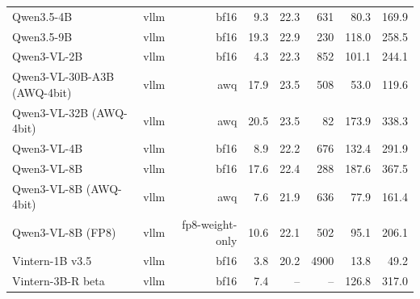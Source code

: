 \begin{table}[t]
\begin{tabular}{lrrrrrrr}
Qwen3.5-4B & vllm & bf16 & 9.3 & 22.3 & 631 & 80.3 & 169.9 \\
Qwen3.5-9B & vllm & bf16 & 19.3 & 22.9 & 230 & 118.0 & 258.5 \\
Qwen3-VL-2B & vllm & bf16 & 4.3 & 22.3 & 852 & 101.1 & 244.1 \\
Qwen3-VL-30B-A3B (AWQ-4bit) & vllm & awq & 17.9 & 23.5 & 508 & 53.0 & 119.6 \\
Qwen3-VL-32B (AWQ-4bit) & vllm & awq & 20.5 & 23.5 & 82 & 173.9 & 338.3 \\
Qwen3-VL-4B & vllm & bf16 & 8.9 & 22.2 & 676 & 132.4 & 291.9 \\
Qwen3-VL-8B & vllm & bf16 & 17.6 & 22.4 & 288 & 187.6 & 367.5 \\
Qwen3-VL-8B (AWQ-4bit) & vllm & awq & 7.6 & 21.9 & 636 & 77.9 & 161.4 \\
Qwen3-VL-8B (FP8) & vllm & fp8-weight-only & 10.6 & 22.1 & 502 & 95.1 & 206.1 \\
Vintern-1B v3.5 & vllm & bf16 & 3.8 & 20.2 & 4900 & 13.8 & 49.2 \\
Vintern-3B-R beta & vllm & bf16 & 7.4 & – & – & 126.8 & 317.0 \\
\bottomrule
\end{tabular}
\end{table}
